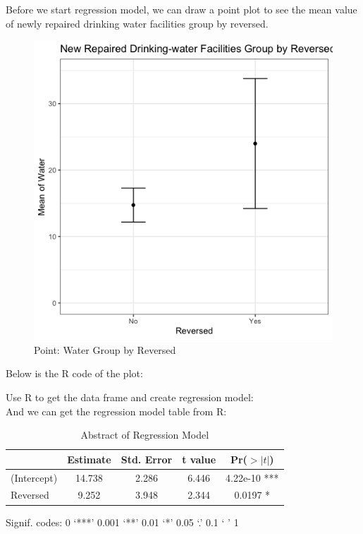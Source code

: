 \documentclass[12pt,letterpaper]{article}
\begin{document}
\begin{enumerate}
	Before we start regression model, we can draw a point plot to see the mean value of newly repaired drinking water facilities group by reversed. \\
	\begin{figure}[h]
	\centering
	\caption{Point: Water Group by Reversed}
	\includegraphics[scale=0.5]{Point&ci_Water_Groupby_Reversed.png}
	\end{figure}
	
	Below is the R code of the plot:
	
	
	Use R to get the data frame and create regression model: \\
	
	
	And we can get the regression model table from R:
	
	\begin{table}[ht]
		\centering
		\caption{Abstract of Regression Model}
		\begin{tabular}{lcccc}
			\toprule
			& Estimate & Std. Error & t value & Pr($>|t|$) \\
			\midrule
			(Intercept) & 14.738 & 2.286 & 6.446 & 4.22e-10 *** \\
			Reversed & 9.252 & 3.948 & 2.344 & 0.0197 * \\
			\bottomrule
		\end{tabular} 
	\end{table}
	Signif. codes:  0 ‘***’ 0.001 ‘**’ 0.01 ‘*’ 0.05 ‘.’ 0.1 ‘ ’ 1 \\
	

\end{enumerate}
\end{document}
